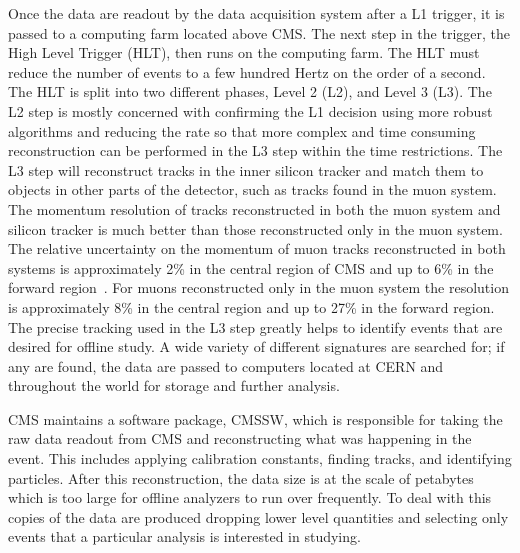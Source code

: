 Once the data are readout by the data acquisition system after a L1 trigger, it is passed to a computing farm located above CMS.
The next step in the trigger, the High Level Trigger (HLT), then runs on the computing farm.
The HLT must reduce the number of events to a few hundred Hertz on the order of a second. 
The HLT is split into two different
phases, Level 2 (L2), and Level 3 (L3). The L2 step is mostly concerned with confirming the L1 decision using more robust algorithms
and reducing the rate so that more complex and time consuming reconstruction can be performed in the L3 step within the time restrictions.
The L3 step will reconstruct tracks in the inner silicon tracker and match them
to objects in other parts of the detector, such as tracks found in the muon system. The momentum resolution of tracks reconstructed in both the muon system and silicon tracker
is much better than those reconstructed only in the muon system. The relative uncertainty on the momentum of muon tracks reconstructed in both systems is approximately
2\% in the central region of CMS and up to 6\% in the forward region~\cite{2012JInst...7P0002T}. For muons reconstructed only in the muon system the 
resolution is approximately 8\%
in the central region and up to 27\% in the forward region. 
The precise tracking used in the L3 step greatly helps to identify events that are desired for offline study.
A wide variety of different signatures are searched for; if any are found, the data are passed to computers located at CERN
and throughout the world for storage and further analysis.

CMS maintains a software package, CMSSW, which is responsible for taking the raw data readout from CMS and reconstructing what was happening in the event.
This includes applying calibration constants, finding tracks, and identifying particles.
After this reconstruction, the data size is at the scale of petabytes which is too large for offline analyzers to run over frequently. 
To deal with this copies of the data are produced dropping lower level quantities and selecting only events that a particular analysis is interested in studying.

